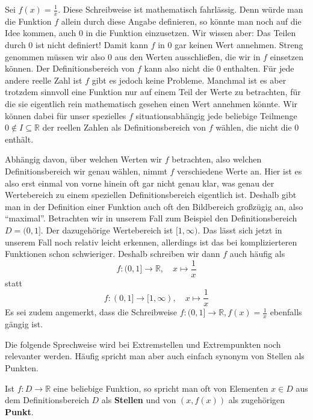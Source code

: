 \begin{example} \label{bsp:defbereich-wertebereich-bildbereich}
    Sei \(f(x) = \frac{1}{x}\). Diese Schreibweise ist mathematisch fahrlässig. Denn würde man die Funktion \(f\) allein durch diese Angabe definieren, so könnte man noch auf die Idee kommen, auch \(0\) in die Funktion einzusetzen. Wir wissen aber: Das Teilen durch \(0\) ist nicht definiert! Damit kann \(f\) in \(0\) gar keinen Wert annehmen. Streng genommen müssen wir also \(0\) aus den Werten ausschließen, die wir in \(f\) einsetzen können. Der Definitionsbereich von \(f\) kann also nicht die \(0\) enthalten. Für jede andere reelle Zahl ist \(f\) gibt es jedoch keine Probleme. Manchmal ist es aber trotzdem sinnvoll eine Funktion nur auf einem Teil der Werte zu betrachten, für die sie eigentlich rein mathematisch gesehen einen Wert annehmen könnte. Wir können dabei für unser spezielles \(f\) situationsabhängig jede beliebige Teilmenge \(0 \notin I\subseteq \mathbb R\) der reellen Zahlen als Definitionsbereich von \(f\) wählen, die nicht die \(0\) enthält. \par 
    Abhängig davon, über welchen Werten wir \(f\) betrachten, also welchen Definitionsbereich wir genau wählen, nimmt \(f\) verschiedene Werte an. Hier ist es also erst einmal von vorne hinein oft gar nicht genau klar, was genau der Wertebereich zu einem speziellen Definitionsbereich eigentlich ist. Deshalb gibt man in der Definition einer Funktion auch oft den Bildbereich großzügig an, also "`maximal"'. Betrachten wir in unserem Fall zum Beispiel den Definitionsbereich \(D = (0,1]\). Der dazugehörige Wertebereich ist \([1, \infty)\). Das lässt sich jetzt in unserem Fall noch relativ leicht erkennen, allerdings ist das bei komplizierteren Funktionen schon schwieriger. Deshalb schreiben wir dann \(f\) auch häufig als 
    \begin{equation*}
        f: (0,1] \to \mathbb R, \quad x \mapsto \frac{1}{x}
    \end{equation*}
    statt
    \begin{equation*}
        f: (0,1] \to [1, \infty), \quad x \mapsto \frac{1}{x}
    \end{equation*}
    Es sei zudem angemerkt, dass die Schreibweise \(f:(0,1]\to \mathbb R, f(x) = \frac{1}{x}\) ebenfalls gängig ist. 
\end{example}

Die folgende Sprechweise wird bei Extremstellen und Extrempunkten noch relevanter werden. Häufig spricht man aber auch einfach synonym von Stellen als Punkten. 
\begin{definition}
    Ist \(f:D\to\mathbb R\) eine beliebige Funktion, so spricht man oft von Elementen \(x \in D\) aus dem Definitionsbereich \(D\) als \textbf{Stellen} und von \((x,f(x))\) als zugehörigen \textbf{Punkt}.
\end{definition}

